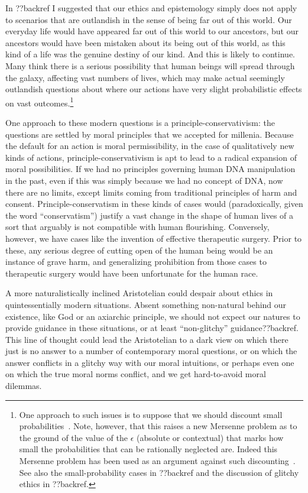 In ??backref I suggested that our ethics and epistemology simply does not apply to scenarios that are outlandish
in the sense of being far out of this world.  Our everyday life would have appeared far out of this world to our 
ancestors, but our ancestors would have been mistaken about its being out of this world, as this kind of a life 
was the genuine destiny of our kind. And this is likely to continue. Many think there is a serious possibility 
that human beings will spread through the galaxy, affecting vast numbers of lives, which may make actual seemingly 
outlandish questions about where our actions have very slight probabilistic effects on vast outcomes.\footnote{One
approach to such issues is to suppose that we should discount small probabilities~\parencite{SmithDiscount,MontonDiscount}.
Note, however, that this raises a new Mersenne problem as to the ground of the value of the $\epsilon$
(absolute or contextual) that marks how small the probabilities that can be rationally neglected are. Indeed
this Mersenne problem has been used as an argument against such discounting~\parencite{WilkinsonDiscount}. See also
the small-probability cases in ??backref and the discussion of glitchy ethics in ??backref.}

One approach to these modern questions is a principle-conservativism: the questions are settled by moral principles that we accepted
for millenia. Because the default for an action is moral permissibility, in the case of qualitatively new kinds of actions, 
principle-conservativism is apt to lead to a radical expansion of moral possibilities. If we had no principles governing human DNA
manipulation in the past, even if this was simply because we had no concept of DNA, now there are no limits, except limits coming
from traditional principles of harm and consent. Principle-conservatism in these kinds of cases would (paradoxically, given the word ``conservatism'') justify a vast 
change in the shape of human lives of a sort that arguably is not compatible with human flourishing. Conversely, however, we have 
cases like the invention of effective therapeutic surgery. Prior to these, any serious degree of cutting open of the human 
being would be an instance of grave harm, and generalizing prohibition from
those cases to therapeutic surgery would have been unfortunate for the human race. 

A more naturalistically inclined Aristotelian could despair about ethics in quintessentially modern situations. 
Absent something non-natural behind our existence, like God or an axiarchic principle, we should not expect our natures to provide guidance in these situations, or at least ``non-glitchy''
guidance??backref. This line of thought could lead the Aristotelian to a dark view on which there just is no answer to a number
of contemporary moral questions, or on which the answer conflicts in a glitchy way with our moral intuitions, or perhaps
even one on which the true moral norms conflict, and we get hard-to-avoid moral dilemmas. 

